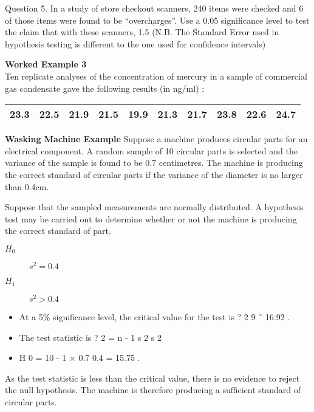 \documentclass[]{report}
\begin{document}
Question 5.
In a study of store checkout scanners, 240 items were checked and 6 of those items were found to be “overcharges”.
Use a 0.05 significance level to test the claim that with these scanners, 1.5 %
(N.B. The Standard Error used in hypothesis testing is different to the one used for confidence intervals)

	\item \textbf{Worked Example 3} \\ Ten replicate analyses of the concentration
	of mercury in a sample of commercial gas condensate gave the
	following results (in ng/ml) :
	
	\begin{tabular}{|c|c|c|c|c|c|c|c|c|c|}
		\hline
		23.3 & 22.5 & 21.9 & 21.5 & 19.9 & 21.3 & 21.7 & 23.8 & 22.6 &
		24.7\\
		\hline
	\end{tabular}
	
	\item \textbf{Wasking Machine Example}%
	Suppose a machine produces circular parts for an electrical component. A random sample of 10 circular parts is selected and the variance of the sample is found to be 0.7 centimetres. The machine is producing the correct standard of circular parts if the variance of the diameter is no larger than 0.4cm.
	
	Suppose that the sampled measurements are normally distributed. A hypothesis test may be carried out to determine whether or not the machine is producing the correct standard of part.
	
	\begin{description}
		\item[$H_0$] $s^2=0.4$
		\item[$H_1$] $s^2>0.4$
	\end{description} 
	
	\begin{itemize}
		\item At a 5\% significance level, the critical value for the test is ? 2 9 ˜ 16.92 . 
		\item The test statistic is ? 2 = n - 1 s 2 s 2 
		\item H 0 = 10 - 1 × 0.7 0.4 = 15.75 .
	\end{itemize}
	
	
	
	
	As the test statistic is less than the critical value, there is no evidence to reject the null hypothesis. The machine is therefore producing a sufficient standard of circular parts.
	
\end{document}
